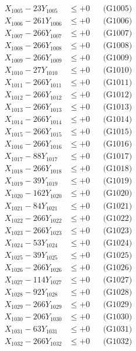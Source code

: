\documentclass[a4paper,10pt]{article}
\begin{document}
{\begin{align}
X_{1005} - 23Y_{1005} &\leq +0 && \text{(G1005)} \\
X_{1006} - 261Y_{1006} &\leq +0 && \text{(G1006)} \\
X_{1007} - 266Y_{1007} &\leq +0 && \text{(G1007)} \\
X_{1008} - 266Y_{1008} &\leq +0 && \text{(G1008)} \\
X_{1009} - 266Y_{1009} &\leq +0 && \text{(G1009)} \\
X_{1010} - 27Y_{1010} &\leq +0 && \text{(G1010)} \\
\allowbreak
X_{1011} - 266Y_{1011} &\leq +0 && \text{(G1011)} \\
X_{1012} - 266Y_{1012} &\leq +0 && \text{(G1012)} \\
X_{1013} - 266Y_{1013} &\leq +0 && \text{(G1013)} \\
X_{1014} - 266Y_{1014} &\leq +0 && \text{(G1014)} \\
X_{1015} - 266Y_{1015} &\leq +0 && \text{(G1015)} \\
X_{1016} - 266Y_{1016} &\leq +0 && \text{(G1016)} \\
X_{1017} - 88Y_{1017} &\leq +0 && \text{(G1017)} \\
X_{1018} - 266Y_{1018} &\leq +0 && \text{(G1018)} \\
X_{1019} - 39Y_{1019} &\leq +0 && \text{(G1019)} \\
X_{1020} - 162Y_{1020} &\leq +0 && \text{(G1020)} \\
\allowbreak
X_{1021} - 84Y_{1021} &\leq +0 && \text{(G1021)} \\
X_{1022} - 266Y_{1022} &\leq +0 && \text{(G1022)} \\
X_{1023} - 266Y_{1023} &\leq +0 && \text{(G1023)} \\
X_{1024} - 53Y_{1024} &\leq +0 && \text{(G1024)} \\
X_{1025} - 39Y_{1025} &\leq +0 && \text{(G1025)} \\
X_{1026} - 266Y_{1026} &\leq +0 && \text{(G1026)} \\
X_{1027} - 114Y_{1027} &\leq +0 && \text{(G1027)} \\
X_{1028} - 92Y_{1028} &\leq +0 && \text{(G1028)} \\
X_{1029} - 266Y_{1029} &\leq +0 && \text{(G1029)} \\
X_{1030} - 206Y_{1030} &\leq +0 && \text{(G1030)} \\
\allowbreak
X_{1031} - 63Y_{1031} &\leq +0 && \text{(G1031)} \\
X_{1032} - 266Y_{1032} &\leq +0 && \text{(G1032)} \\

\end{align}}
\end{document}

